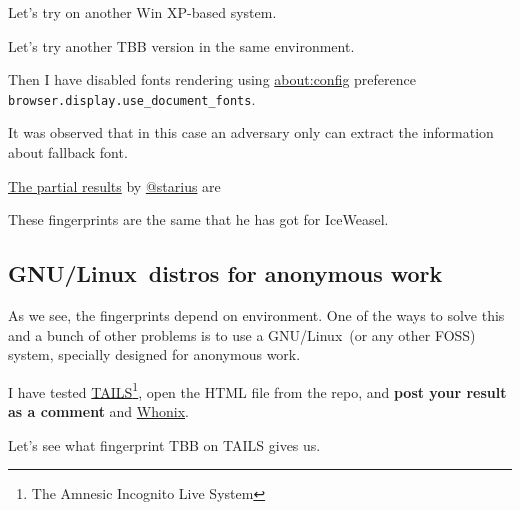 \documentclass[letterpaper,14pt]{article}
\begin{document}


Let's try on another Win XP-based system.



Let's try another TBB version in the same environment.




Then I have disabled fonts rendering using \href{about:config}{\url{about:config}} preference \lstinline!browser.display.use_document_fonts!.




It was observed that in this case an adversary only can extract the information about fallback font.

\href{https://geektimes.ru/post/244484/\#comment_8227810}{The partial results} by \href{https://geektimes.ru/users/starius/}{@starius} are




These fingerprints are the same that he has got for IceWeasel.

\subsection{GNU/Linux\texttrademark\ distros for anonymous work}\label{linux-distros-for-anonymous-work}

As we see, the fingerprints depend on environment. One of the ways to solve this and a bunch of other problems is to use a GNU/Linux\texttrademark\ (or any other FOSS) system, specially designed for anonymous work.

I have tested \href{https://tails.boum.org/}{TAILS}\footnote{The Amnesic Incognito Live System}, open the HTML file from the repo, and \textbf{post your result as a comment} and \href{https://www.whonix.org/}{Whonix}.

Let's see what fingerprint TBB on TAILS gives us.
\end{document}
